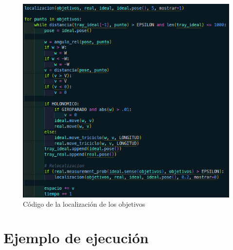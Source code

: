 \documentclass[11pt]{report}
\begin{document}
\begin{figure}[H]
  \centering
  \includegraphics[scale=0.45]{img/localizacion_objetivos.png}
  \caption{Código de la localización de los objetivos}
\end{figure}

\newpage

\section{Ejemplo de ejecución}
\end{document}
